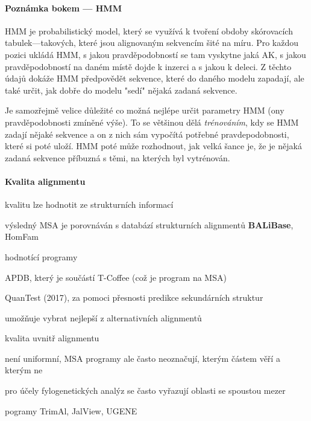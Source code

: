 \documentclass[DIV=8]{scrreprt}
\newcommand{\mybox}[2]{
    \paragraph{#1} #2
}
\begin{document}
\mybox{Poznámka bokem --- HMM}{HMM je probabilistický model, který se využívá k tvoření obdoby skórovacích tabulek---takových, které jsou alignovaným sekvencím šité na míru. Pro každou pozici ukládá HMM, s jakou pravděpodobností se tam vyskytne jaká AK, s jakou pravděpodobností na daném místě dojde k inzerci a s jakou k deleci. Z těchto údajů dokáže HMM předpovědět sekvence, které do daného modelu zapadají, ale také určit, jak dobře do modelu "sedí" nějaká zadaná sekvence.

Je samozřejmě velice důležité co možná nejlépe určit parametry HMM (ony pravděpodobnosti zmíněné výše). To se většinou dělá \emph{trénováním}, kdy se HMM zadají nějaké sekvence a on z nich sám vypočítá potřebné pravdepodobnosti, které si poté uloží. HMM poté může rozhodnout, jak velká šance je, že je nějaká zadaná sekvence příbuzná s těmi, na kterých byl vytrénován.}


\paragraph{Kvalita alignmentu}
\begin{myItemize}[nosep]
    \item kvalitu lze hodnotit ze strukturních informací
    \item výsledný MSA je porovnáván s databází strukturních alignmentů \textbf{BALiBase}, HomFam
    \item hodnotící programy
\begin{myItemize}[nosep]
    \item APDB, který je součástí T-Coffee (což je program na MSA)
    \item QuanTest (2017), za pomoci přesnosti predikce sekundárních struktur
\end{myItemize}

    \item umožňuje vybrat nejlepší z alternativních alignmentů
    \item kvalita uvnitř alignmentu
\begin{myItemize}[nosep]
    \item není uniformní, MSA programy ale často neoznačují, kterým částem věří a kterým ne
    \item pro účely fylogenetických analýz se často vyřazují oblasti se spoustou mezer
    \item pogramy TrimAl, JalView, UGENE
\end{myItemize}

\end{myItemize}
\end{document}
